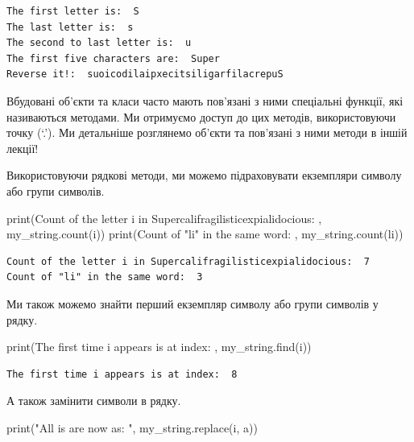 \documentclass[
  letterpaper,
]{report}
\newenvironment{Shaded}{\begin{snugshade}}{\end{snugshade}}
\newcommand{\BuiltInTok}[1]{\textcolor[rgb]{0.00,0.23,0.31}{#1}}
\newcommand{\NormalTok}[1]{\textcolor[rgb]{0.00,0.23,0.31}{#1}}
\newcommand{\StringTok}[1]{\textcolor[rgb]{0.13,0.47,0.30}{#1}}
\begin{document}
\begin{verbatim}
The first letter is:  S
The last letter is:  s
The second to last letter is:  u
The first five characters are:  Super
Reverse it!:  suoicodilaipxecitsiligarfilacrepuS
\end{verbatim}

Вбудовані об'єкти та класи часто мають пов'язані з ними спеціальні
функції, які називаються методами. Ми отримуємо доступ до цих методів,
використовуючи точку (`.'). Ми детальніше розглянемо об'єкти та
пов'язані з ними методи в іншій лекції!

Використовуючи рядкові методи, ми можемо підраховувати екземпляри
символу або групи символів.

\begin{Shaded}
\begin{Highlighting}[]
\BuiltInTok{print}\NormalTok{(}\StringTok{\textquotesingle{}Count of the letter i in Supercalifragilisticexpialidocious: \textquotesingle{}}\NormalTok{, my\_string.count(}\StringTok{\textquotesingle{}i\textquotesingle{}}\NormalTok{))}
\BuiltInTok{print}\NormalTok{(}\StringTok{\textquotesingle{}Count of "li" in the same word: \textquotesingle{}}\NormalTok{, my\_string.count(}\StringTok{\textquotesingle{}li\textquotesingle{}}\NormalTok{))}
\end{Highlighting}
\end{Shaded}

\begin{verbatim}
Count of the letter i in Supercalifragilisticexpialidocious:  7
Count of "li" in the same word:  3
\end{verbatim}

Ми також можемо знайти перший екземпляр символу або групи символів у
рядку.

\begin{Shaded}
\begin{Highlighting}[]
\BuiltInTok{print}\NormalTok{(}\StringTok{\textquotesingle{}The first time i appears is at index: \textquotesingle{}}\NormalTok{, my\_string.find(}\StringTok{\textquotesingle{}i\textquotesingle{}}\NormalTok{))}
\end{Highlighting}
\end{Shaded}

\begin{verbatim}
The first time i appears is at index:  8
\end{verbatim}

А також замінити символи в рядку.

\begin{Shaded}
\begin{Highlighting}[]
\BuiltInTok{print}\NormalTok{(}\StringTok{"All i\textquotesingle{}s are now a\textquotesingle{}s: "}\NormalTok{, my\_string.replace(}\StringTok{\textquotesingle{}i\textquotesingle{}}\NormalTok{, }\StringTok{\textquotesingle{}a\textquotesingle{}}\NormalTok{))}
\end{Highlighting}
\end{Shaded}
\end{document}
